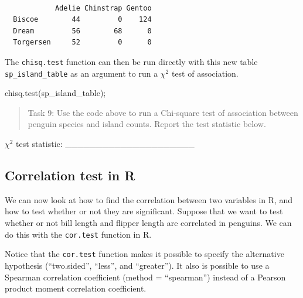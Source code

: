 \documentclass[
]{scrbook}
\newenvironment{Shaded}{\begin{snugshade}}{\end{snugshade}}
\newcommand{\AttributeTok}[1]{\textcolor[rgb]{0.77,0.63,0.00}{#1}}
\newcommand{\FunctionTok}[1]{\textcolor[rgb]{0.00,0.00,0.00}{#1}}
\newcommand{\NormalTok}[1]{#1}
\newcommand{\SpecialCharTok}[1]{\textcolor[rgb]{0.00,0.00,0.00}{#1}}
\newcommand{\StringTok}[1]{\textcolor[rgb]{0.31,0.60,0.02}{#1}}
\begin{document}
\begin{verbatim}
           
            Adelie Chinstrap Gentoo
  Biscoe        44         0    124
  Dream         56        68      0
  Torgersen     52         0      0
\end{verbatim}

The \texttt{chisq.test} function can then be run directly with this new table \texttt{sp\_island\_table} as an argument to run a \(\chi^{2}\) test of association.

\begin{Shaded}
\begin{Highlighting}[]
\FunctionTok{chisq.test}\NormalTok{(sp\_island\_table);}
\end{Highlighting}
\end{Shaded}

\begin{quote}
Task 9: Use the code above to run a Chi-square test of association between penguin species and island counts. Report the test statistic below.
\end{quote}

\(\chi^{2}\) test statistic: \_\_\_\_\_\_\_\_\_\_\_\_\_\_\_\_\_\_\_\_\_

\hypertarget{correlation-test-in-r}{%
\subsection{Correlation test in R}\label{correlation-test-in-r}}

We can now look at how to find the correlation between two variables in R, and how to test whether or not they are significant.
Suppose that we want to test whether or not bill length and flipper length are correlated in penguins.
We can do this with the \texttt{cor.test} function in R.

\begin{Shaded}
\end{Shaded}

Notice that the \texttt{cor.test} function makes it possible to specify the alternative hypothesis (``two.sided'', ``less'', and ``greater'').
It also is possible to use a Spearman correlation coefficient (method = ``spearman'') instead of a Pearson product moment correlation coefficient.
\end{document}
